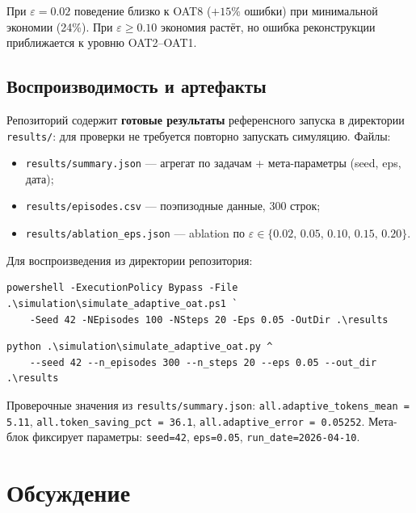 \documentclass[12pt,a4paper]{article}
\begin{document}
При $\varepsilon = 0.02$ поведение близко к OAT8 ($+15\%$ ошибки) при
минимальной экономии (24\%). При $\varepsilon \geq 0.10$ экономия растёт,
но ошибка реконструкции приближается к уровню OAT2--OAT1.

\subsection{Воспроизводимость и артефакты}

Репозиторий содержит \textbf{готовые результаты} референсного запуска
в директории \texttt{results/}: для проверки не требуется повторно запускать
симуляцию. Файлы:

\begin{itemize}[leftmargin=1.4cm]
    \item \texttt{results/summary.json} --- агрегат по задачам + мета-параметры
          (seed, eps, дата);
    \item \texttt{results/episodes.csv} --- поэпизодные данные, 300 строк;
    \item \texttt{results/ablation\_eps.json} --- ablation по
          $\varepsilon \in \{0.02,\,0.05,\,0.10,\,0.15,\,0.20\}$.
\end{itemize}

Для воспроизведения из директории репозитория:

\begin{lstlisting}[style=shell, caption={PowerShell (без зависимостей)}]
powershell -ExecutionPolicy Bypass -File .\simulation\simulate_adaptive_oat.ps1 `
    -Seed 42 -NEpisodes 100 -NSteps 20 -Eps 0.05 -OutDir .\results
\end{lstlisting}

\begin{lstlisting}[style=shell, caption={Python 3.8+}]
python .\simulation\simulate_adaptive_oat.py ^
    --seed 42 --n_episodes 300 --n_steps 20 --eps 0.05 --out_dir .\results
\end{lstlisting}

Проверочные значения из \texttt{results/summary.json}:
\texttt{all.adaptive\_tokens\_mean = 5.11},
\texttt{all.token\_saving\_pct = 36.1},
\texttt{all.adaptive\_error = 0.05252}.
Мета-блок фиксирует параметры: \texttt{seed=42}, \texttt{eps=0.05},
\texttt{run\_date=2026-04-10}.

\section{Обсуждение}
\end{document}
